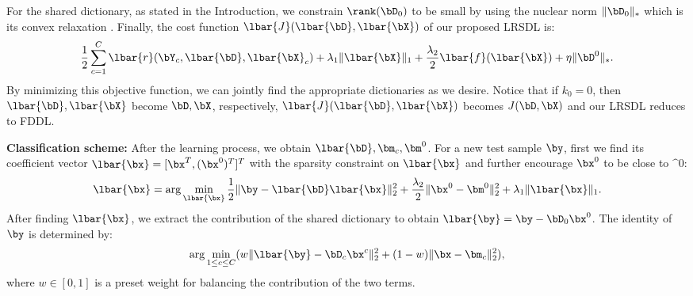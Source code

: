 \documentclass[letterpaper]{article}
\begin{document}
\par For the shared dictionary, as stated in the Introduction, we constrain $\rank(\bD_0)$ to be small by using the nuclear norm $\|\bD_0\|_*$ which is its convex relaxation \cite{recht2010guaranteed}. Finally, the cost function $\lbar{J}(\lbar{\bD}, \lbar{\bX})$ of our proposed LRSDL is:
\vspace{-0.1in}
\begin{equation}
\label{eqn:mainsddl}
   \frac{1}{2}\sum_{c=1}^C \lbar{r}(\bY_c, \lbar{\bD}, \lbar{\bX}_c) + \lambda_1\|\lbar{\bX}\|_1 + \frac{\lambda_2}{2} \lbar{f}(\lbar{\bX}) + \eta \|\bD^0\|_*.
\end{equation}
By minimizing this objective function, we can jointly find the appropriate dictionaries as we desire. Notice that if $k_0 = 0$, then $\lbar{\bD}, \lbar{\bX}$ become $\bD, \bX$, respectively, $\lbar{J}(\lbar{\bD}, \lbar{\bX}) $ becomes $J(\bD, \bX)$ and our LRSDL reduces to FDDL.
\par
\noindent \textbf{Classification scheme:} After the learning process, we obtain $\lbar{\bD}, \bm_c, \bm^0$. For a new test sample $\by$, first we find its coefficient vector $\lbar{\bx} = [\bx^T, (\bx^0)^T]^T$ with the sparsity constraint on $\lbar{\bx}$ and further encourage $\bx^0$ to be close to $\bm^0$:
\begin{equation}
\label{eqn:findcodebarx}
    \lbar{\bx} = \arg\min_{\lbar{\bx}} \frac{1}{2}\|\by - \lbar{\bD}\lbar{\bx}\|_2^2 + \frac{\lambda_2}{2}\|\bx^0 - \bm^0\|_2^2 + \lambda_1\|\lbar{\bx}\|_1.
\end{equation}
After finding $\lbar{\bx}$, we extract the contribution of the shared dictionary to obtain $\lbar{\by} = \by - \bD_0\bx^0$. The identity of $\by$ is determined by:
\begin{equation}
    \arg\min_{1 \leq c \leq C} (w\|\lbar{\by} - \bD_c\bx^c\|_2^2 + (1-w)\|\bx - \bm_c\|_2^2),
\end{equation}
where $w \in [0,1]$ is a preset weight for balancing the contribution of the two terms.
\end{document}
